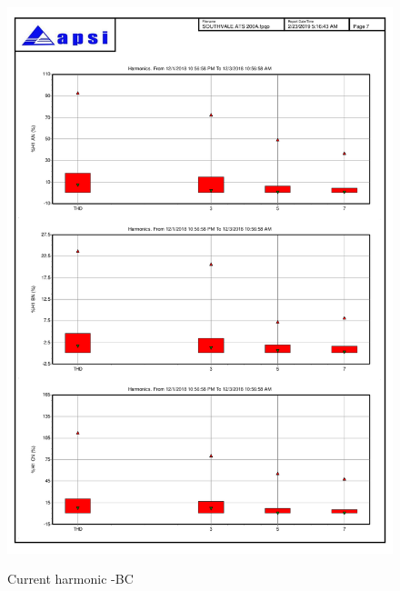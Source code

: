 \begin{figure}
	\includegraphics[width=\textwidth]{figures/fig_ch04_elecaudit_harmonicstudy05} \\
	\caption{Current harmonic -BC}
	\label{fig_ch04_elecaudit_harmonicstudy05} 
\end{figure}


